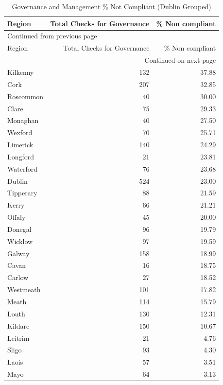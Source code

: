 \documentclass[a4paper,11pt,twoside]{article}
\begin{document}
\begin{longtable}{lrr}
\caption{Governance and Management \% Not Compliant (Dublin Grouped)}
\\[0pt]
Region & Total Checks for Governance & \% Non compliant\\[0pt]
\hline
\endfirsthead
\multicolumn{3}{l}{Continued from previous page} \\[0pt]
\hline

Region & Total Checks for Governance & \% Non compliant \\[0pt]

\hline
\endhead
\hline\multicolumn{3}{r}{Continued on next page} \\
\endfoot
\endlastfoot
\hline
Kilkenny & 132 & 37.88\\[0pt]
Cork & 207 & 32.85\\[0pt]
Roscommon & 40 & 30.00\\[0pt]
Clare & 75 & 29.33\\[0pt]
Monaghan & 40 & 27.50\\[0pt]
Wexford & 70 & 25.71\\[0pt]
Limerick & 140 & 24.29\\[0pt]
Longford & 21 & 23.81\\[0pt]
Waterford & 76 & 23.68\\[0pt]
Dublin & 524 & 23.00\\[0pt]
Tipperary & 88 & 21.59\\[0pt]
Kerry & 66 & 21.21\\[0pt]
Offaly & 45 & 20.00\\[0pt]
Donegal & 96 & 19.79\\[0pt]
Wicklow & 97 & 19.59\\[0pt]
Galway & 158 & 18.99\\[0pt]
Cavan & 16 & 18.75\\[0pt]
Carlow & 27 & 18.52\\[0pt]
Westmeath & 101 & 17.82\\[0pt]
Meath & 114 & 15.79\\[0pt]
Louth & 130 & 12.31\\[0pt]
Kildare & 150 & 10.67\\[0pt]
Leitrim & 21 & 4.76\\[0pt]
Sligo & 93 & 4.30\\[0pt]
Laois & 57 & 3.51\\[0pt]
Mayo & 64 & 3.13\\[0pt]
\end{longtable}
\end{document}
